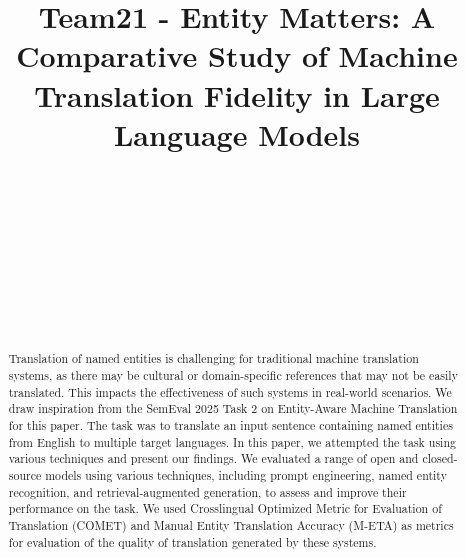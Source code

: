 \documentclass{ecai}
\begin{document}
\begin{frontmatter}

\title{Team21 - Entity Matters: A Comparative Study of Machine Translation Fidelity in Large Language Models}

\author{~}
\author{}
\author{~}
\author{~}
\author{~}
\author{~}


\begin{abstract}
Translation of named entities is challenging for traditional machine translation systems, as there may be cultural 
or domain-specific references that may not be easily translated. 
This impacts the effectiveness of such systems in real-world scenarios. 
We draw inspiration from the SemEval 2025 Task 2 on Entity-Aware Machine Translation for this paper. 
The task was to translate an input sentence containing named entities from English to multiple target languages. 
In this paper, we attempted the task using various techniques and present our findings. 
We evaluated a range of open and closed-source models using various techniques, including prompt engineering, named entity recognition, and retrieval-augmented generation, 
to assess and improve their performance on the task.
We used Crosslingual Optimized Metric for Evaluation of Translation (COMET)\cite{rei-etal-2020-comet}
and Manual Entity Translation Accuracy (M-ETA) as metrics for evaluation of the quality of translation generated by these systems.
\end{abstract}
\end{frontmatter}


\end{document}
